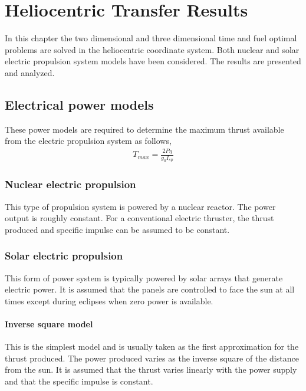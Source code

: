 \chapter{Heliocentric Transfer Results}

\ifpdf
    \graphicspath{{Chapter4/Figs/Raster/}{Chapter4/Figs/PDF/}{Chapter4/Figs/}}
\else
    \graphicspath{{Chapter4/Figs/Vector/}{Chapter4/Figs/}}
\fi

In this chapter the two dimensional and three dimensional time and fuel optimal problems are solved in the heliocentric coordinate system. Both nuclear and solar electric propulsion system models have been considered. The results are presented and analyzed. 
\section{Electrical power models}
These power models are required to determine the maximum thrust available from the electric propulsion system as follows,
\begin{align}
	T_{max}=\frac{2P\eta}{g_0 I_{sp}}
\end{align}
\subsection{Nuclear electric propulsion}
This type of propulsion system is powered by a nuclear reactor. The power output is roughly constant. For a conventional electric thruster, the thrust produced and specific impulse can be assumed to be constant. 
\subsection{Solar electric propulsion}
This form of power system is typically powered by solar arrays that generate electric power. It is assumed that the panels are controlled to face the sun at all times except during eclipses when zero power is available.
\subsubsection{Inverse square model}
This is the simplest model and is usually taken as the first approximation for the thrust produced. The power produced varies as the inverse square of the distance from the sun. It is assumed that the thrust varies linearly with the power supply and that the specific impulse is constant.
